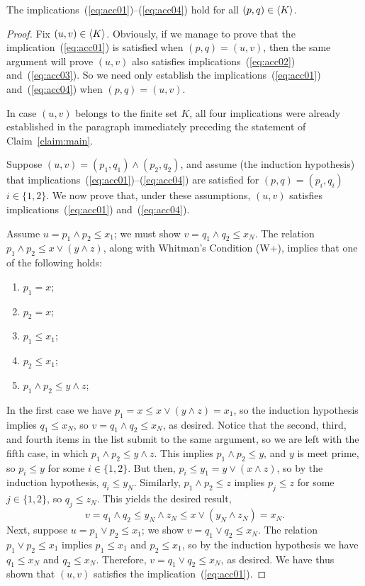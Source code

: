 \begin{claim}\label{claim:main}
  The implications~(\ref{eq:acc01})--(\ref{eq:acc04}) hold for all $(p,q) \in \langle K\rangle$.
\end{claim}
\begin{proof}
Fix $(u, v) \in  \langle K\rangle$. Obviously, if we manage to prove that the implication~(\ref{eq:acc01}) is satisfied when $(p,q) = (u,v)$, then the same argument will prove $(u,v)$ also satisfies implications~(\ref{eq:acc02}) and~(\ref{eq:acc03}).  So we need only establish the implications~(\ref{eq:acc01}) and~(\ref{eq:acc04}) when $(p,q) = (u,v)$.

In case $(u,v)$ belongs to the finite set $K$, all four implications were already established in the paragraph immediately preceding the statement of Claim~\ref{claim:main}.

Suppose $(u,v) = (p_1, q_1) \wedge (p_2, q_2)$, and assume (the induction hypothesis) that implications~(\ref{eq:acc01})--(\ref{eq:acc04}) are satisfied 
for $(p,q) = (p_i,q_i)$ $i\in \{1,2\}$.
We now prove that, under these assumptions, $(u,v)$ satisfies implications~(\ref{eq:acc01})
and~(\ref{eq:acc04}).

Assume $u = p_1\wedge p_2 \leq x_1$; we must show $v=q_1\wedge q_2 \leq x_N$.
The relation $p_1\wedge p_2 \leq x\vee (y \wedge z)$, along with Whitman's Condition (W+), implies that one of the following holds:
\begin{enumerate}
  \item   $p_1=x$;  
  \item   $p_2=x$;  
  \item   $p_1\leq x_1$;  
  \item   $p_2\leq x_1$;  
  \item   $p_1\wedge p_2 \leq y \wedge z$;  
\end{enumerate}
In the first case we have $p_1 = x \leq x \vee (y \wedge z) = x_1$, so
the induction hypothesis implies $q_1\leq x_N$, so $v = q_1\wedge q_2\leq x_N$, as desired.  Notice that the second, third, and fourth items in the list submit to the same argument, so we are left with the fifth case, 
in which $p_1\wedge p_2 \leq y \wedge z$. 
This implies $p_1\wedge p_2 \leq y$, and $y$ is meet prime, so 
$p_i\leq y$ for some $i\in \{1,2\}$.  But then, $p_i \leq y_1 = y\vee (x\wedge z)$, so by the induction hypothesis, $q_i \leq y_N$.
Similarly, $p_1\wedge p_2 \leq z$ implies 
$p_j\leq z$ for some $j\in \{1,2\}$, so $q_j \leq z_N$.
This yields the desired result,
\[
v = q_1\wedge q_2 \leq y_N \wedge z_N \leq x \vee (y_N\wedge z_N) = x_N.
\] 
Next, suppose $u = p_1\vee p_2 \leq x_1$; we show $v = q_1 \vee q_2 \leq x_N$. The relation $p_1\vee p_2 \leq x_1$ implies $p_1\leq x_1$ and 
$p_2\leq x_1$, so by the induction hypothesis we have 
$q_1\leq x_N$ and 
$q_2\leq x_N$.  Therefore, $v = q_1 \vee q_2 \leq x_N$, as desired.
We have thus shown that $(u,v)$ satisfies the implication~(\ref{eq:acc01}).


\end{proof}
